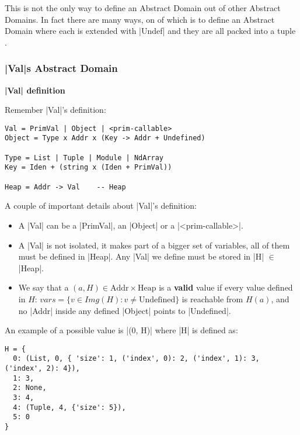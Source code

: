 This is not the only way to define an Abstract Domain out of other
Abstract Domains. In fact there are many ways, on of which is to define
an Abstract Domain where each is extended with \pycode|Undef| and they
are all packed into a tuple {}.

{}

\subsubsection*{\texorpdfstring{\pycode|Val|s Abstract
Domain}{Vals Abstract Domain}}\label{vals-abstract-domain}

\noindent \textbf{\pycode|Val| definition}

Remember \pycode|Val|'s definition:

\begin{verbatim}
Val = PrimVal | Object | <prim-callable>
Object = Type x Addr x (Key -> Addr + Undefined)

Type = List | Tuple | Module | NdArray
Key = Iden + (string x (Iden + PrimVal))

Heap = Addr -> Val    -- Heap
\end{verbatim}

A couple of important details about \pycode|Val|'s definition:

\begin{itemize}
\tightlist
\item
  A \pycode|Val| can be a \pycode|PrimVal|, an \pycode|Object| or a
  \pycode|<prim-callable>|.
\item
  A \pycode|Val| is not isolated, it makes part of a bigger set of
  variables, all of them must be defined in \pycode|Heap|. Any
  \pycode|Val| we define must be stored in \pycode|H| \(\in\)
  \pycode|Heap|.
\item
  We say that a \((a, H) \in \text{Addr} \times \text{Heap}\) is a
  \textbf{valid} value if every value defined in \(H\):
  \(vars = \{v \in Img(H) : v \ne \text{Undefined}\}\) is reachable from
  \(H(a)\), and no \pycode|Addr| inside any defined \pycode|Object|
  points to \pycode|Undefined|.
\end{itemize}

An example of a possible value is \pycode|(0, H)| where \pycode|H| is
defined as:

\begin{verbatim}
H = {
  0: (List, 0, { 'size': 1, ('index', 0): 2, ('index', 1): 3, ('index', 2): 4}),
  1: 3,
  2: None,
  3: 4,
  4: (Tuple, 4, {'size': 5}),
  5: 0
}
\end{verbatim}

